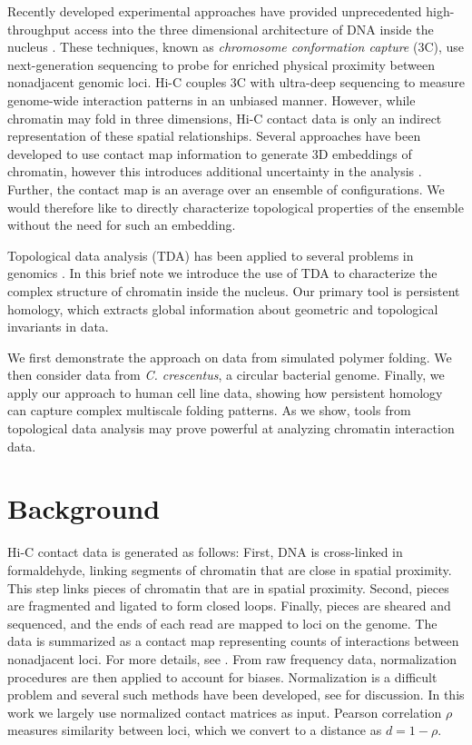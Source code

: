 Recently developed experimental approaches have provided unprecedented high-throughput access into the three dimensional architecture of DNA inside the nucleus \cite{LiebermanAiden:2009jz,Dekker:2013hi,Ay:2015gv}.
These techniques, known as \emph{chromosome conformation capture} (3C), use next-generation sequencing to probe for enriched physical proximity between nonadjacent genomic loci.
Hi-C couples 3C with ultra-deep sequencing to measure genome-wide interaction patterns in an unbiased manner.
However, while chromatin may fold in three dimensions, Hi-C contact data is only an indirect representation of these spatial relationships.
Several approaches have been developed to use contact map information to generate 3D embeddings of chromatin, however this introduces additional uncertainty in the analysis \cite{Ay:2015gv}.
Further, the contact map is an average over an ensemble of configurations.
We would therefore like to directly characterize topological properties of the ensemble without the need for such an embedding.

Topological data analysis (TDA) has been applied to several problems in genomics \cite{Chan:2013,Emmett:2014a}.
In this brief note we introduce the use of TDA to characterize the complex structure of chromatin inside the nucleus.
Our primary tool is persistent homology, which extracts global information about geometric and topological invariants in data.

We first demonstrate the approach on data from simulated polymer folding.
We then consider data from \emph{C. crescentus}, a circular bacterial genome.
Finally, we apply our approach to human cell line data, showing how persistent homology can capture complex multiscale folding patterns.
As we show, tools from topological data analysis may prove powerful at analyzing chromatin interaction data.

\section{Background}
\label{sec:background}
%
Hi-C contact data is generated as follows:
First, DNA is cross-linked in formaldehyde, linking segments of chromatin that are close in spatial proximity.
This step links pieces of chromatin that are in spatial proximity.
Second, pieces are fragmented and ligated to form closed loops.
Finally, pieces are sheared and sequenced, and the ends of each read are mapped to loci on the genome.
The data is summarized as a contact map representing counts of interactions between nonadjacent loci.
For more details, see \cite{Dekker:2013hi}.
From raw frequency data, normalization procedures are then applied to account for biases.
Normalization is a difficult problem and several such methods have been developed, see \cite{Ay:2015gv} for discussion.
In this work we largely use normalized contact matrices as input.
Pearson correlation $\rho$ measures similarity between loci, which we convert to a distance as $d=1-\rho$.

